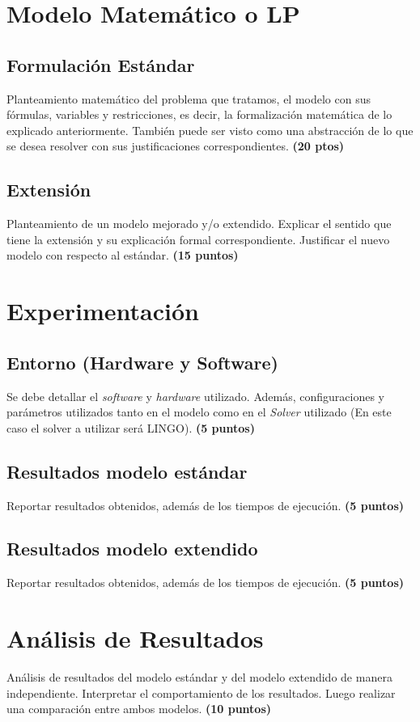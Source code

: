 \documentclass[journal, 10pt]{IEEEtran}
\begin{document}
\section{Modelo Matemático o LP}
\subsection{Formulación Estándar}
Planteamiento matemático del problema que tratamos, el modelo con sus fórmulas, variables y restricciones, es decir, la formalización matemática de lo explicado anteriormente. También puede ser visto como una abstracción de lo que se desea resolver con sus justificaciones correspondientes. \textbf{(20 ptos)}

\subsection{Extensión}
Planteamiento de un modelo mejorado y/o extendido. Explicar el sentido que tiene la extensión y su explicación formal correspondiente. Justificar el nuevo modelo con respecto al estándar. \textbf{(15 puntos)}

\section{Experimentación}
\subsection{Entorno (Hardware y Software)}
Se debe detallar el \textit{software} y \textit{hardware} utilizado. Además, configuraciones y parámetros utilizados tanto en el modelo como en el \textit{Solver} utilizado (En este caso el solver a utilizar será LINGO). \textbf{(5 puntos)}
\subsection{Resultados modelo estándar} 
Reportar resultados obtenidos, además de los tiempos de ejecución. \textbf{(5 puntos)}

\subsection{Resultados modelo extendido}
Reportar resultados obtenidos, además de los tiempos de ejecución. \textbf{(5 puntos)}

\section{Análisis de Resultados}
Análisis de resultados del modelo estándar y del modelo extendido de manera independiente. Interpretar el comportamiento de los resultados. Luego realizar una comparación entre ambos modelos. \textbf{(10 puntos)}
\end{document}
